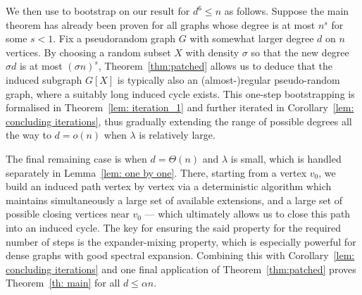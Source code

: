 \documentclass[reqno,a4paper]{amsart}
\theoremstyle{definition}
\newcommand{\lyuc}[1]{{\color{blue}{ [~Lyuben:\ }\emph{#1}\textbf{~]}}}
\begin{document}
We then use  to bootstrap on our result for $d^6\le n$ as follows. 
Suppose the main theorem has already been proven for all graphs whose degree is at most $n^s$ for some $s<1$. 
Fix a pseudorandom graph $G$ with somewhat larger degree $d$ on $n$ vertices. 
By choosing a random subset $X$ with density $\sigma$ so that the new degree $\sigma d$ is at most $(\sigma n)^s$, Theorem~\ref{thm:patched} allows us to deduce that the induced subgraph $G[X]$ is typically also an (almost-)regular pseudo-random graph, where a suitably long induced cycle exists. 
This one-step bootstrapping is formalised in Theorem~\ref{lem: iteration_1} and further iterated in Corollary~\ref{lem: concluding iterations}, thus gradually extending the range of possible degrees all the way to $d=o(n)$ when $\lambda$ is relatively large. 

The final remaining case is when $d=\Theta(n)$ and $\lambda$ is small, which is handled separately in Lemma~\ref{lem: one by one}. 
There, starting from a vertex $v_0$, we build an induced path vertex by vertex via a deterministic algorithm which maintains simultaneously a large set of available extensions, and a large set of possible closing vertices near $v_0$ --- which ultimately allows us to close this path into an induced cycle. 
The key for ensuring the said property for the required number of steps is the expander-mixing property, which is especially powerful for dense graphs with good spectral expansion.
Combining this with Corollary~\ref{lem: concluding iterations} and one final application of Theorem~\ref{thm:patched} proves
Theorem~\ref{th: main} for all $d\le \alpha n$.
\end{document}
